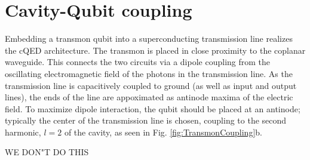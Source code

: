 \documentclass[11 pt, oneside]{book} %
\begin{document}


\section{Cavity-Qubit coupling}
Embedding a transmon qubit into a superconducting transmission line realizes the cQED architecture. The transmon is placed in close proximity to the coplanar waveguide. This connects the two circuits via a dipole coupling from the oscillating electromagnetic field of the photons in the transmission line. As the transmission line is capacitively coupled to ground (as well as input and output lines), the ends of the line are appoximated as antinode maxima of the electric field. To maximize dipole interaction, the qubit should be placed at an antinode; typically the center of the transmission line is chosen, coupling to the second harmonic, $l=2$ of the cavity, as seen in Fig. \ref{fig:TransmonCoupling}b. 

WE DON"T DO THIS
\end{document}
